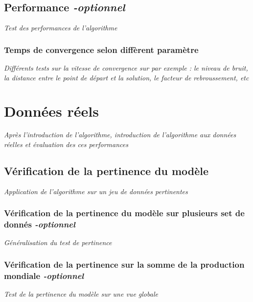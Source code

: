 \documentclass{article}
\begin{document}
\subsection{Performance \textit{-optionnel}}
\textit{Test des performances de l'algorithme}

\subsubsection{Temps de convergence selon diffèrent paramètre}
\textit{Différents tests sur la vitesse de convergence sur par exemple : le niveau de bruit, la distance entre le point de départ et la solution, le facteur de rebroussement, etc }

\section{Données réels}
\textit{Après l'introduction de l'algorithme, introduction de l'algorithme aux données réelles et évaluation des ces performances}

\subsection{Vérification de la pertinence du modèle}
\textit{Application de l'algorithme sur un jeu de données pertinentes}

\subsubsection{Vérification de la pertinence du modèle sur plusieurs set de donnés \textit{-optionnel}}
\textit{Généralisation du test de pertinence}

\subsubsection{Vérification de la pertinence sur la somme de la production mondiale \textit{-optionnel}}
\textit{Test de la pertinence du modèle sur une vue globale}
\end{document}
